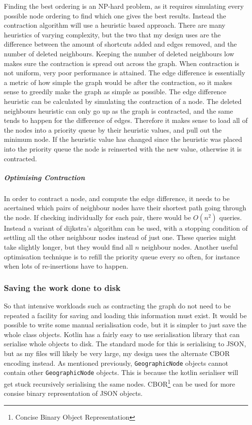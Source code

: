 \documentclass[11pt,twoside,a4paper]{article}
\begin{document}
Finding the best ordering is an NP-hard problem, as it requires simulating every possible node ordering to find which one gives the best results. Instead the contraction algorithm will use a heuristic based approach. There are many heuristics of varying complexity, but the 
two that my design uses are the difference between the amount of shortcuts added and edges removed, and the number of deleted neighbours. Keeping the number of deleted neighbours low makes sure the contraction is spread out across the graph. When contraction is not uniform, very poor performance is attained.
The edge difference is essentially a metric of how simple the graph would be after the contraction, so it makes sense to greedily make the graph as simple as possible. The edge difference heuristic can be calculated by simulating the contraction of a node.
The deleted neighbours heuristic can only go up as the graph is contracted, and the same tends to happen for the difference of edges. Therefore it makes sense to load all of the nodes into a priority queue by their heuristic values,
and pull out the minimum node. If the heuristic value has changed since the heuristic was placed into the priority queue the node is reinserted with the new value, otherwise it is contracted.    
\subparagraph{Optimising Contraction}
In order to contract a node, and compute the edge difference, it needs to be acertained which pairs of neighbour nodes have their shortest path going through the node. If checking individually for each pair, there would be $O(n^2)$ queries.
Instead a variant of dijkstra's algorithm can be used, with a stopping condition of settling all the other neighbour nodes instead of just one. These queries might take slightly longer, but they would find all $n$ neighbour nodes.
Another useful optimisation technique is to refill the priority queue every so often, for instance when lots of re-insertions have to happen. 
\subsubsection{Saving the work done to disk}
\label{sec:serialization}
So that intensive workloads such as contracting the graph do not need to be repeated a facility for saving and loading this information must exist.
It would be possible to write some manual serialisation code, but it is simpler to just save the whole class objects. Kotlin has a 
fairly easy to use serialisation library that can serialise whole objects to disk\cite{kotlinh}. The standard mode for this is serialising to JSON, but as my files will likely be very large, my design uses the alternate CBOR encoding instead.
As mentioned previously, \texttt{GeographicNode} objects cannot contain other \texttt{GeographicNode} objects. This is because the kotlin serialiser will get stuck recursively serialising the same nodes. 
CBOR\footnote{Concise Binary Object Representation} can be used for more consise binary representation of JSON objects.
\end{document}
